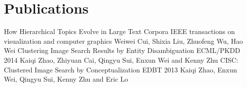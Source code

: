 \documentclass[10pt,a4paper,roman]{moderncv} %
\begin{document}
\section{Publications}
        {How Hierarchical Topics Evolve in Large Text Corpora\footnotemark[8]{}}
        {IEEE transactions on visualization and computer graphics}{}{}
        {Weiwei Cui, Shixia Liu, Zhuofeng Wu, Hao Wei}
        {Clustering Image Search Results by Entity Disambiguation}
        {ECML/PKDD 2014}{}{}
        {Kaiqi Zhao, Zhiyuan Cai, Qingyu Sui, Enxun Wei and Kenny Zhu}
        {CISC: Clustered Image Search by Conceptualization}
        {EDBT 2013}{}{}
        {Kaiqi Zhao, Enxun Wei, Qingyu Sui, Kenny Zhu and Eric Lo}

\end{document}
